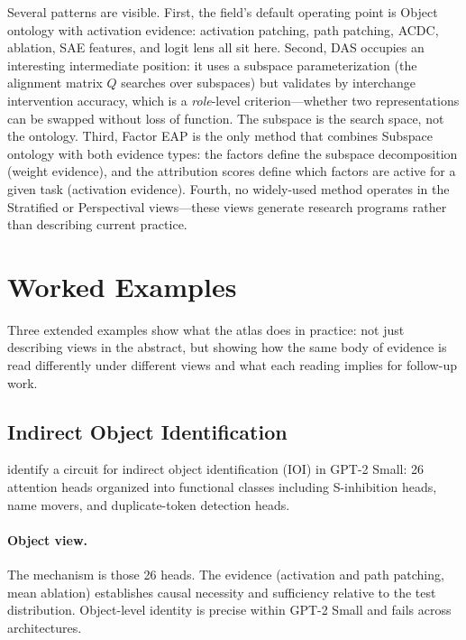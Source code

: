 \documentclass[11pt]{article}
\theoremstyle{remark}
\begin{document}
Several patterns are visible.  First, the field's default operating point
is Object ontology with activation evidence: activation patching, path
patching, ACDC, ablation, SAE features, and logit lens all sit here.
Second, DAS occupies an interesting intermediate position: it uses a
subspace parameterization (the alignment matrix $Q$ searches over
subspaces) but validates by interchange intervention accuracy, which is a
\emph{role}-level criterion---whether two representations can be swapped
without loss of function.  The subspace is the search space, not the
ontology.  Third, Factor EAP \citep{tower2026weight} is the only method
that combines Subspace ontology with both evidence types: the factors
define the subspace decomposition (weight evidence), and the attribution
scores define which factors are active for a given task (activation
evidence).  Fourth, no widely-used method operates in the Stratified or
Perspectival views---these views generate research programs rather than
describing current practice.

\section{Worked Examples}\label{sec:examples}

Three extended examples show what the atlas does in practice: not just
describing views in the abstract, but showing how the same body of
evidence is read differently under different views and what each reading
implies for follow-up work.

\subsection{Indirect Object Identification}

\citet{wang2022} identify a circuit for indirect object identification
(IOI) in GPT-2 Small: 26 attention heads organized into functional
classes including S-inhibition heads, name movers, and
duplicate-token detection heads.

\paragraph{Object view.}
The mechanism is those 26 heads.  The evidence (activation and path
patching, mean ablation) establishes causal necessity and sufficiency
relative to the test distribution.  Object-level identity is precise
within GPT-2 Small and fails across architectures.
\end{document}
